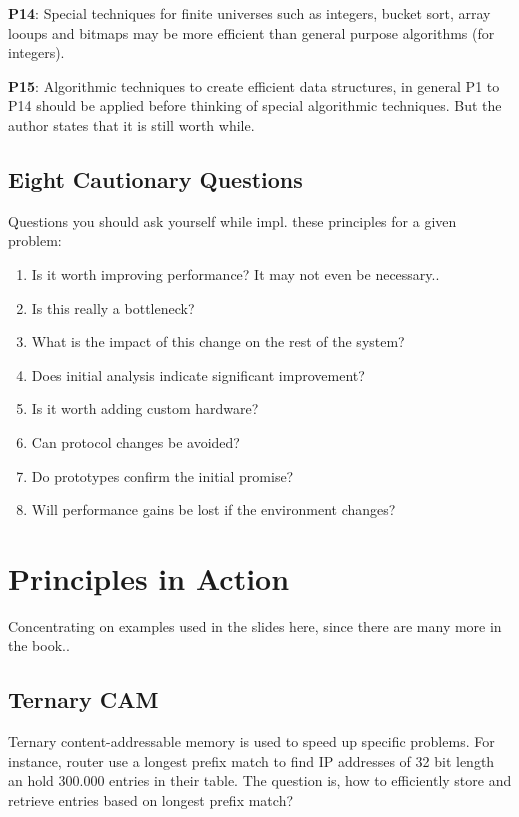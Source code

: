 \textbf{P14}: Special techniques for finite universes such as integers, bucket sort, array looups and bitmaps may be more efficient than general purpose algorithms (for integers).

\textbf{P15}: Algorithmic techniques to create efficient data structures, in general P1 to P14 should be applied before thinking of special algorithmic techniques. But the author states that it is still worth while.

\subsection{Eight Cautionary Questions}
Questions you should ask yourself while impl. these principles for a given problem:

\begin{enumerate}
	\item Is it worth improving performance? It may not even be necessary..
	\item Is this really a bottleneck?
	\item What is the impact of this change on the rest of the system?
	\item Does initial analysis indicate significant improvement?
	\item Is it worth adding custom hardware?
	\item Can protocol changes be avoided?
	\item Do prototypes confirm the initial promise?
	\item Will performance gains be lost if the environment changes?
\end{enumerate}

\section{Principles in Action}

Concentrating on examples used in the slides here, since there are many more in the book..

\subsection{Ternary CAM}

Ternary content-addressable memory is used to speed up specific problems. For instance, router use a longest prefix match to find IP addresses of 32 bit length an hold 300.000 entries in their table. The question is, how to efficiently store and retrieve entries based on longest prefix match?


